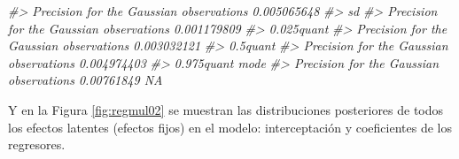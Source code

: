 \documentclass[
]{book}
\newenvironment{Shaded}{\begin{snugshade}}{\end{snugshade}}
\newcommand{\AttributeTok}[1]{\textcolor[rgb]{0.77,0.63,0.00}{#1}}
\newcommand{\CommentTok}[1]{\textcolor[rgb]{0.56,0.35,0.01}{\textit{#1}}}
\newcommand{\ControlFlowTok}[1]{\textcolor[rgb]{0.13,0.29,0.53}{\textbf{#1}}}
\newcommand{\DecValTok}[1]{\textcolor[rgb]{0.00,0.00,0.81}{#1}}
\newcommand{\FloatTok}[1]{\textcolor[rgb]{0.00,0.00,0.81}{#1}}
\newcommand{\FunctionTok}[1]{\textcolor[rgb]{0.00,0.00,0.00}{#1}}
\newcommand{\NormalTok}[1]{#1}
\newcommand{\OtherTok}[1]{\textcolor[rgb]{0.56,0.35,0.01}{#1}}
\newcommand{\SpecialCharTok}[1]{\textcolor[rgb]{0.00,0.00,0.00}{#1}}
\newcommand{\StringTok}[1]{\textcolor[rgb]{0.31,0.60,0.02}{#1}}
\begin{document}
\begin{Shaded}
\begin{Highlighting}[]
\CommentTok{\#\textgreater{} Precision for the Gaussian observations 0.005065648}
\CommentTok{\#\textgreater{}                                                  sd}
\CommentTok{\#\textgreater{} Precision for the Gaussian observations 0.001179809}
\CommentTok{\#\textgreater{}                                          0.025quant}
\CommentTok{\#\textgreater{} Precision for the Gaussian observations 0.003032121}
\CommentTok{\#\textgreater{}                                            0.5quant}
\CommentTok{\#\textgreater{} Precision for the Gaussian observations 0.004974403}
\CommentTok{\#\textgreater{}                                         0.975quant mode}
\CommentTok{\#\textgreater{} Precision for the Gaussian observations 0.00761849   NA}
\end{Highlighting}
\end{Shaded}

Y en la Figura \ref{fig:regmul02} se muestran las distribuciones posteriores de todos los efectos latentes (efectos fijos) en el modelo: interceptación y coeficientes de los regresores.

\begin{Shaded}
\end{Shaded}
\end{document}
